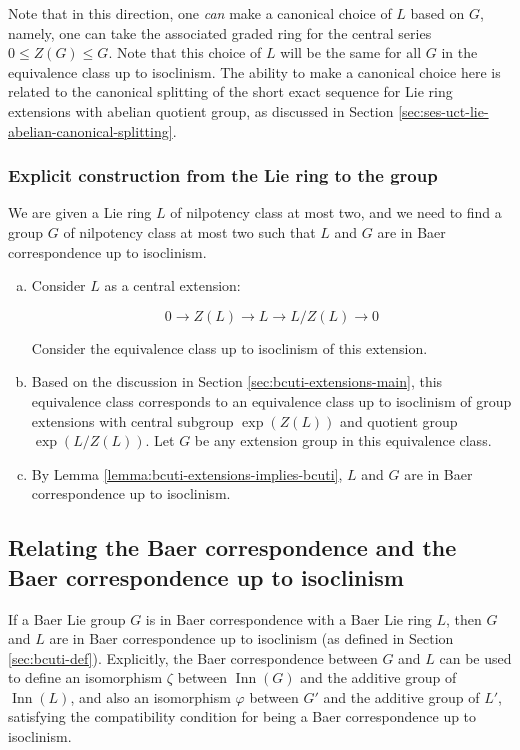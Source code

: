 \documentclass{ucetd}
\begin{document}
Note that in this direction, one {\em can} make a canonical choice of
$L$ based on $G$, namely, one can take the associated graded ring for
the central series $0 \le Z(G) \le G$. Note that this choice of $L$
will be the same for all $G$ in the equivalence class up to
isoclinism. The ability to make a canonical choice here is related to
the canonical splitting of the short exact sequence for Lie ring
extensions with abelian quotient group, as discussed in Section
\ref{sec:ses-uct-lie-abelian-canonical-splitting}.

\subsubsection{Explicit construction from the Lie ring to the group}

We are given a Lie ring $L$ of nilpotency class at most two, and we
need to find a group $G$ of nilpotency class at most two such that $L$
and $G$ are in Baer correspondence up to isoclinism.

\begin{enumerate}[(a)]
\item Consider $L$ as a central extension:

  $$0 \to Z(L) \to L \to L/Z(L) \to 0$$

  Consider the equivalence class up to isoclinism of this extension.

\item Based on the discussion in Section
  \ref{sec:bcuti-extensions-main}, this equivalence class corresponds
  to an equivalence class up to isoclinism of group extensions with
  central subgroup $\exp(Z(L))$ and quotient group $\exp(L/Z(L))$. Let
  $G$ be any extension group in this equivalence class.

\item By Lemma \ref{lemma:bcuti-extensions-implies-bcuti}, $L$ and $G$
  are in Baer correspondence up to isoclinism.
\end{enumerate}

\subsection{Relating the Baer correspondence and the Baer correspondence up to isoclinism}\label{sec:bc-and-bcuti}

If a Baer Lie group $G$ is in Baer correspondence with a Baer Lie ring
$L$, then $G$ and $L$ are in Baer correspondence up to isoclinism (as
defined in Section \ref{sec:bcuti-def}). Explicitly, the Baer
correspondence between $G$ and $L$ can be used to define an
isomorphism $\zeta$ between $\operatorname{Inn}(G)$ and the additive
group of $\operatorname{Inn}(L)$, and also an isomorphism $\varphi$
between $G'$ and the additive group of $L'$, satisfying the
compatibility condition for being a Baer correspondence up to isoclinism.
\end{document}
